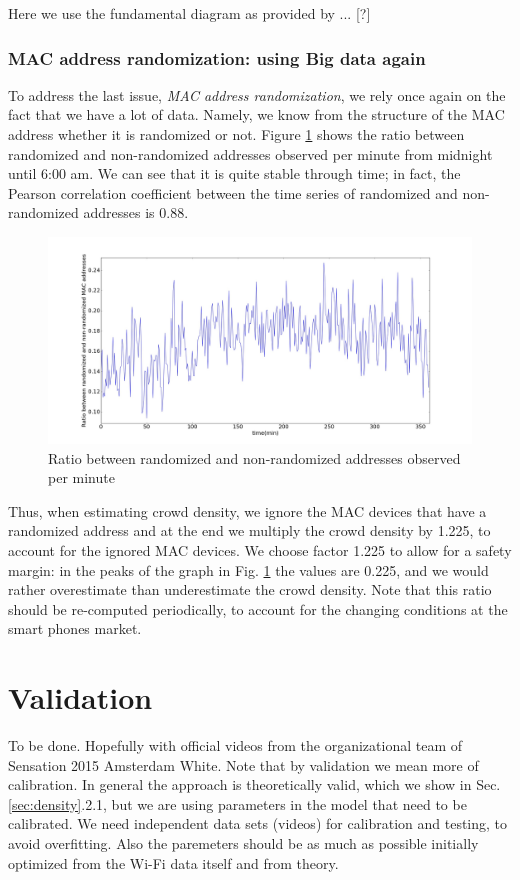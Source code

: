 \documentclass[10pt,a4paper]{article}
\begin{document}
Here we use the fundamental diagram as provided by ... [?]


\subsubsection{MAC address randomization: using Big data again}

To address the last issue, {\it MAC address randomization}, we rely once again on the fact that we have a lot of data. Namely, we know from the structure of the MAC address whether it is randomized or not. Figure \ref{fig:randomized} shows the ratio between randomized and non-randomized addresses observed per minute from midnight until 6:00 am. We can see that it is quite stable through time; in fact, the Pearson correlation coefficient between the time series of randomized and non-randomized addresses is 0.88. 

\begin{figure}[h!]
	\centering
	\includegraphics[width=130mm]{RatioRandNonrand.jpeg}
	\caption{Ratio between randomized and non-randomized addresses observed per minute}
	\label{fig:randomized}
\end{figure} 

Thus, when estimating crowd density, we ignore the MAC devices that have a randomized address and at the end we multiply the crowd density by 1.225, to account for the ignored MAC devices. We choose factor 1.225 to allow for a safety margin: in the peaks of the graph in Fig. \ref{fig:randomized} the values are 0.225, and we would rather overestimate than underestimate the crowd density. 
Note that this ratio should be re-computed periodically, to account for the changing conditions at the smart phones market. 



\section{Validation}\label{sec:validation}
To be done.
Hopefully with official videos from the organizational team of  Sensation 2015 Amsterdam White.
Note that by validation we mean more of calibration. In general the approach is theoretically valid, which we show in Sec.\ref{sec:density}.2.1, but we are using parameters in the model that need to be calibrated. We need independent data sets (videos) for calibration and testing, to avoid overfitting. Also the paremeters should be as much as possible initially optimized from the Wi-Fi data itself and from theory.
\end{document}
